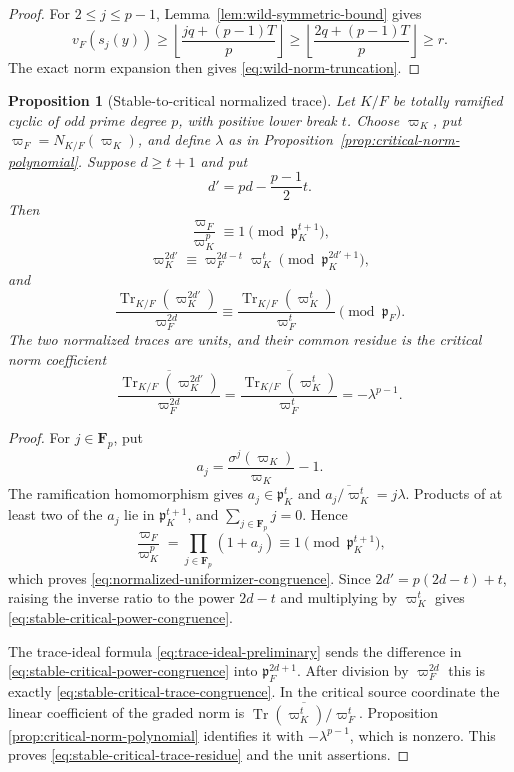 \documentclass[11pt]{amsart}
\newtheorem{proposition}[theorem]{Proposition}
\theoremstyle{definition}
\theoremstyle{remark}
\newcommand{\F}{\mathbf F}
\newcommand{\p}{\mathfrak p}
\newcommand{\Tr}{\operatorname{Tr}}
\begin{document}
\begin{proof}
For $2\le j\le p-1$, Lemma~\ref{lem:wild-symmetric-bound} gives
\[
 v_F(s_j(y))\ge
 \left\lfloor\frac{jq+(p-1)T}{p}\right\rfloor
 \ge
 \left\lfloor\frac{2q+(p-1)T}{p}\right\rfloor\ge r.
\]
The exact norm expansion then gives
\eqref{eq:wild-norm-truncation}.
\end{proof}

\begin{proposition}[Stable-to-critical normalized trace]
\label{prop:stable-critical-trace}
Let $K/F$ be totally ramified cyclic of odd prime degree $p$, with
positive lower break $t$.  Choose $\varpi_K$, put
$\varpi_F=N_{K/F}(\varpi_K)$, and define $\lambda$ as in
Proposition~\ref{prop:critical-norm-polynomial}.  Suppose $d\ge t+1$
and put
\[
 d'=pd-\frac{p-1}{2}t.
\]
Then
\begin{equation}\label{eq:normalized-uniformizer-congruence}
 \frac{\varpi_F}{\varpi_K^p}
 \equiv1\pmod{\p_K^{t+1}},
\end{equation}
\begin{equation}\label{eq:stable-critical-power-congruence}
 \varpi_K^{2d'}
 \equiv \varpi_F^{2d-t}\varpi_K^t
 \pmod{\p_K^{2d'+1}},
\end{equation}
and
\begin{equation}\label{eq:stable-critical-trace-congruence}
 \frac{\Tr_{K/F}(\varpi_K^{2d'})}{\varpi_F^{2d}}
 \equiv
 \frac{\Tr_{K/F}(\varpi_K^t)}{\varpi_F^t}
 \pmod{\p_F}.
\end{equation}
The two normalized traces are units, and their common residue is the
critical norm coefficient
\begin{equation}\label{eq:stable-critical-trace-residue}
 \overline{\frac{\Tr_{K/F}(\varpi_K^{2d'})}{\varpi_F^{2d}}}
 =\overline{\frac{\Tr_{K/F}(\varpi_K^t)}{\varpi_F^t}}
 =-\lambda^{p-1}.
\end{equation}
\end{proposition}

\begin{proof}
For $j\in\F_p$, put
\[
 a_j=\frac{\sigma^j(\varpi_K)}{\varpi_K}-1.
\]
The ramification homomorphism gives $a_j\in\p_K^t$ and
$\overline{a_j/\varpi_K^t}=j\lambda$.  Products of at least two of the
$a_j$ lie in $\p_K^{t+1}$, and $\sum_{j\in\F_p}j=0$.  Hence
\[
 \frac{\varpi_F}{\varpi_K^p}
 =\prod_{j\in\F_p}(1+a_j)
 \equiv1\pmod{\p_K^{t+1}},
\]
which proves \eqref{eq:normalized-uniformizer-congruence}.  Since
$2d'=p(2d-t)+t$, raising the inverse ratio to the power $2d-t$ and
multiplying by $\varpi_K^t$ gives
\eqref{eq:stable-critical-power-congruence}.

The trace-ideal formula \eqref{eq:trace-ideal-preliminary} sends the difference in
\eqref{eq:stable-critical-power-congruence} into $\p_F^{2d+1}$.
After division by $\varpi_F^{2d}$ this is exactly
\eqref{eq:stable-critical-trace-congruence}.  In the critical source
coordinate the linear coefficient of the graded norm is
$\overline{\Tr(\varpi_K^t)/\varpi_F^t}$.  Proposition
\ref{prop:critical-norm-polynomial} identifies it with
$-\lambda^{p-1}$, which is nonzero.  This proves
\eqref{eq:stable-critical-trace-residue} and the unit assertions.
\end{proof}
\end{document}
